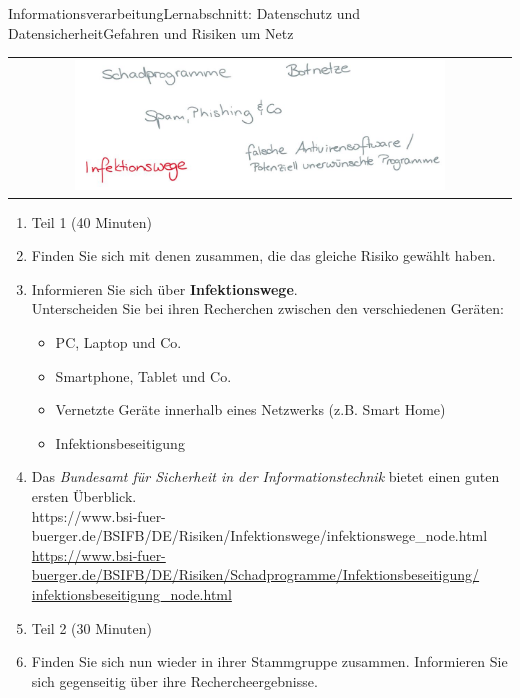 \documentclass[oneside,openany,headings=optiontotoc,11pt,numbers=noenddot]{scrreprt}
\begin{document}
\begin{worksheet}{Informationsverarbeitung}{Lernabschnitt: Datenschutz und Datensicherheit}{Gefahren und Risiken um Netz}
		\newpage
		\setcounter{page}{1}
		\begin{framed}
			\begin{tabular}{lcr}
				& \includegraphics[width=0.8\textwidth]{../99_Bilder/Infektionswege.jpg} & \\
			\end{tabular}
		\end{framed}
		\begin{enumerate}[label=(\Roman*.)]
			\item[] \color{gray}Teil 1 (40 Minuten)\normalcolor
			\item Finden Sie sich mit denen zusammen, die das gleiche Risiko gewählt haben.
			\item Informieren Sie sich über \textbf{Infektionswege}.\\
			Unterscheiden Sie bei ihren Recherchen zwischen den verschiedenen Geräten:
			\begin{itemize}[label=+]
				\item PC, Laptop und Co.
				\item Smartphone, Tablet und Co.
				\item Vernetzte Geräte innerhalb eines Netzwerks (z.B. Smart Home)
				\item Infektionsbeseitigung
			\end{itemize}
			\item[] Das \textit{Bundesamt für Sicherheit in der Informationstechnik} bietet einen guten ersten Überblick.\\
			\small{\color{codegray}https://www.bsi-fuer-buerger.de/BSIFB/DE/Risiken/Infektionswege/infektionswege\_node.html}\\
			\small{\color{codegray}\href{https://www.bsi-fuer-buerger.de/BSIFB/DE/Risiken/Schadprogramme/Infektionsbeseitigung/infektionsbeseitigung\_node.html}{https://www.bsi-fuer-buerger.de/BSIFB/DE/Risiken/Schadprogramme/Infektionsbeseitigung/\\infektionsbeseitigung\_node.html}}
			\normalsize
			\item[] \color{gray}Teil 2 (30 Minuten)\normalcolor
			\item Finden Sie sich nun wieder in ihrer Stammgruppe zusammen. Informieren Sie sich gegenseitig über ihre Rechercheergebnisse.
		\end{enumerate}
	

\end{worksheet}
\end{document}
